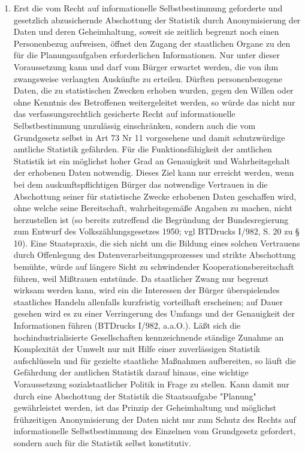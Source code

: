 \begin{enumerate}[label=\arabic*,start=104]
            \item Erst die vom Recht auf informationelle Selbstbestimmung geforderte und gesetzlich abzusichernde Abschottung der Statistik durch Anonymisierung der Daten und deren Geheimhaltung, soweit sie zeitlich begrenzt noch einen Personenbezug aufweisen, öffnet den Zugang der staatlichen Organe zu den für die Planungsaufgaben erforderlichen Informationen. Nur unter dieser Voraussetzung kann und darf vom Bürger erwartet werden, die von ihm zwangsweise verlangten Auskünfte zu erteilen. Dürften personenbezogene Daten, die zu statistischen Zwecken erhoben wurden, gegen den Willen oder ohne Kenntnis des Betroffenen weitergeleitet werden, so würde das nicht nur das verfassungsrechtlich gesicherte Recht auf informationelle Selbstbestimmung unzulässig einschränken, sondern auch die vom Grundgesetz selbst in Art 73 Nr 11 vorgesehene und damit schutzwürdige amtliche Statistik gefährden. Für die Funktionsfähigkeit der amtlichen Statistik ist ein möglichst hoher Grad an Genauigkeit und Wahrheitsgehalt der erhobenen Daten notwendig. Dieses Ziel kann nur erreicht werden, wenn bei dem auskunftspflichtigen Bürger das notwendige Vertrauen in die Abschottung seiner für statistische Zwecke erhobenen Daten geschaffen wird, ohne welche seine Bereitschaft, wahrheitsgemäße Angaben zu machen, nicht herzustellen ist (so bereits zutreffend die Begründung der Bundesregierung zum Entwurf des Volkszählungsgesetzes 1950; vgl BTDrucks I/982, S. 20 zu § 10). Eine Staatspraxis, die sich nicht um die Bildung eines solchen Vertrauens durch Offenlegung des Datenverarbeitungsprozesses und strikte Abschottung bemühte, würde auf längere Sicht zu schwindender Kooperationsbereitschaft führen, weil Mißtrauen entstünde. Da staatlicher Zwang nur begrenzt wirksam werden kann, wird ein die Interessen der Bürger überspielendes staatliches Handeln allenfalls kurzfristig vorteilhaft erscheinen; auf Dauer gesehen wird es zu einer Verringerung des Umfangs und der Genauigkeit der Informationen führen (BTDrucks I/982, a.a.O.). Läßt sich die hochindustrialisierte Gesellschaften kennzeichnende ständige Zunahme an Komplexität der Umwelt nur mit Hilfe einer zuverlässigen Statistik aufschlüsseln und für gezielte staatliche Maßnahmen aufbereiten, so läuft die Gefährdung der amtlichen Statistik darauf hinaus, eine wichtige Voraussetzung sozialstaatlicher Politik in Frage zu stellen. Kann damit nur durch eine Abschottung der Statistik die Staatsaufgabe "Planung" gewährleistet werden, ist das Prinzip der Geheimhaltung und möglichst frühzeitigen Anonymisierung der Daten nicht nur zum Schutz des Rechts auf informationelle Selbstbestimmung des Einzelnen vom Grundgesetz gefordert, sondern auch für die Statistik selbst konstitutiv.

\end{enumerate}
